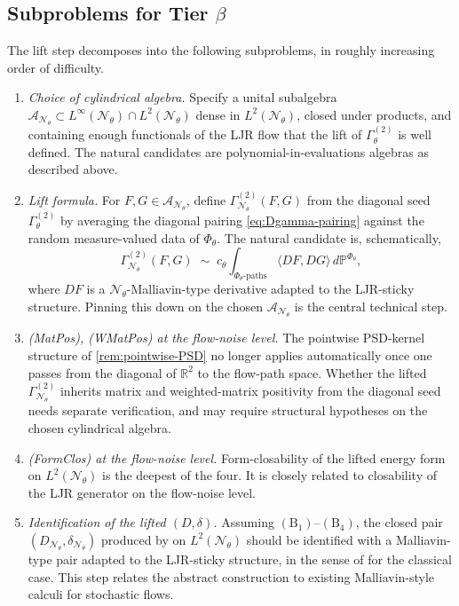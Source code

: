 \documentclass[11pt,reqno]{amsart}
\theoremstyle{plain}
\theoremstyle{definition}
\theoremstyle{remark}
\newcommand{\R}{\mathbb{R}}
\newcommand{\cA}{\mathcal A}
\newcommand{\cN}{\mathcal N}
\begin{document}
\subsection{Subproblems for Tier \texorpdfstring{$\beta$}{beta}}\label{sec:beta-subproblems}

The lift step decomposes into the following subproblems, in
roughly increasing order of difficulty.

\begin{enumerate}
\item[$(\mathrm B_{1})$] \emph{Choice of cylindrical algebra.}
Specify a unital subalgebra
$\cA_{\cN_{\theta}}\subset L^{\infty}(\cN_{\theta})\cap L^{2}(\cN_{\theta})$
dense in $L^{2}(\cN_{\theta})$, closed under products, and
containing enough functionals of the LJR flow that the lift of
$\Gamma^{(2)}_{\theta}$ is well defined. The natural candidates
are polynomial-in-evaluations algebras as described above.
\item[$(\mathrm B_{2})$] \emph{Lift formula.} For
$F,G\in\cA_{\cN_{\theta}}$, define
$\Gamma^{(2)}_{\cN_{\theta}}(F,G)$ from the diagonal seed
$\Gamma^{(2)}_{\theta}$ by averaging the diagonal pairing
\eqref{eq:Dgamma-pairing} against the random measure-valued
data of $\Phi_{\theta}$. The natural candidate is, schematically,
\[
  \Gamma^{(2)}_{\cN_{\theta}}(F,G)
  \;\sim\;c_{\theta}\!\int_{\Phi_{\theta}\text{-paths}}\!\!\langle DF,DG\rangle\,d\mathbb{P}^{\Phi_{\theta}},
\]
where $DF$ is a $\cN_{\theta}$-Malliavin-type derivative
adapted to the LJR-sticky structure. Pinning this down on the
chosen $\cA_{\cN_{\theta}}$ is the central technical step.
\item[$(\mathrm B_{3})$] \emph{(MatPos), (WMatPos) at the
flow-noise level.} The pointwise PSD-kernel structure of
\cref{rem:pointwise-PSD} no longer applies automatically once
one passes from the diagonal of $\R^{2}$ to the flow-path
space. Whether the lifted $\Gamma^{(2)}_{\cN_{\theta}}$ inherits
matrix and weighted-matrix positivity from the diagonal seed
needs separate verification, and may require structural
hypotheses on the chosen cylindrical algebra.
\item[$(\mathrm B_{4})$] \emph{(FormClos) at the flow-noise
level.} Form-closability of the lifted energy form on
$L^{2}(\cN_{\theta})$ is the deepest of the four. It is closely
related to closability of the LJR generator on the
flow-noise level.
\item[$(\mathrm B_{5})$] \emph{Identification of the lifted
$(D,\delta)$.} Assuming $(\mathrm B_{1})$--$(\mathrm B_{4})$, the
closed pair $(D_{\cN_{\theta}},\delta_{\cN_{\theta}})$ produced
by \cite{GammaHierarchyDivergence} on $L^{2}(\cN_{\theta})$
should be identified with a Malliavin-type pair adapted to the
LJR-sticky structure, in the sense of
\cite[Ch.~6]{Nualart} for the classical case. This step
relates the abstract construction to existing Malliavin-style
calculi for stochastic flows.
\end{enumerate}
\end{document}
